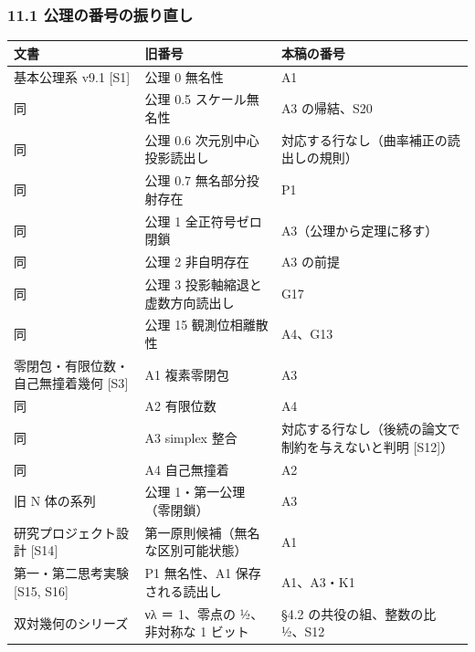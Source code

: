 \documentclass[
  a4paper,
]{ltjsarticle}
\newcounter{none} %
\begin{document}
\subsubsection{11.1
公理の番号の振り直し}\label{ux516cux7406ux306eux756aux53f7ux306eux632fux308aux76f4ux3057}

{\def\LTcaptype{none} %
\begin{longtable}[]{@{}
  >{\raggedright\arraybackslash}p{}
  >{\raggedright\arraybackslash}p{}
  >{\raggedright\arraybackslash}p{}@{}}
\toprule\noalign{}
\begin{minipage}[b]{\linewidth}\raggedright
文書
\end{minipage} & \begin{minipage}[b]{\linewidth}\raggedright
旧番号
\end{minipage} & \begin{minipage}[b]{\linewidth}\raggedright
本稿の番号
\end{minipage} \\
\midrule\noalign{}
\endhead
\bottomrule\noalign{}
\endlastfoot
基本公理系 v9.1 {[}S1{]} & 公理 0 無名性 & A1 \\
同 & 公理 0.5 スケール無名性 & A3 の帰結、S20 \\
同 & 公理 0.6 次元別中心投影読出し &
対応する行なし（曲率補正の読出しの規則） \\
同 & 公理 0.7 無名部分投射存在 & P1 \\
同 & 公理 1 全正符号ゼロ閉鎖 & A3（公理から定理に移す） \\
同 & 公理 2 非自明存在 & A3 の前提 \\
同 & 公理 3 投影軸縮退と虚数方向読出し & G17 \\
同 & 公理 15 観測位相離散性 & A4、G13 \\
零閉包・有限位数・自己無撞着幾何 {[}S3{]} & A1 複素零閉包 & A3 \\
同 & A2 有限位数 & A4 \\
同 & A3 simplex 整合 & 対応する行なし（後続の論文で制約を与えないと判明
{[}S12{]}） \\
同 & A4 自己無撞着 & A2 \\
旧 N 体の系列 & 公理 1・第一公理（零閉鎖） & A3 \\
研究プロジェクト設計 {[}S14{]} & 第一原則候補（無名な区別可能状態） &
A1 \\
第一・第二思考実験 {[}S15, S16{]} & P1 無名性、A1 保存される読出し &
A1、A3・K1 \\
双対幾何のシリーズ & νλ ＝ 1、零点の ½、非対称な 1 ビット & §4.2
の共役の組、整数の比 ½、S12 \\
\end{longtable}
}
\end{document}
